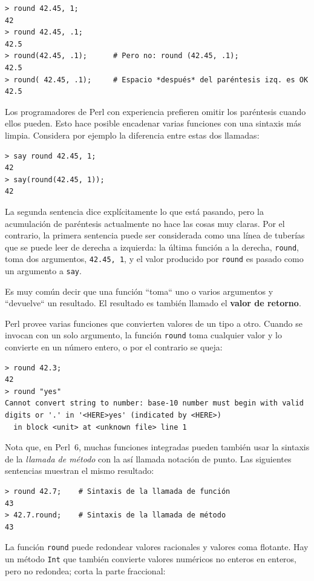 \begin{lstlisting}
> round 42.45, 1;
42
> round 42.45, .1;
42.5
> round(42.45, .1);      # Pero no: round (42.45, .1);
42.5
> round( 42.45, .1);     # Espacio *después* del paréntesis izq. es OK 
42.5
\end{lstlisting}

Los programadores de Perl con experiencia prefieren omitir los 
paréntesis cuando ellos pueden. Esto hace posible encadenar varias 
funciones con una sintaxis más limpia. Considera por ejemplo
la diferencia entre estas dos llamadas:

\begin{lstlisting}
> say round 42.45, 1;
42
> say(round(42.45, 1));
42
\end{lstlisting}

La segunda sentencia dice explícitamente lo que está pasando,
pero la acumulación de paréntesis actualmente no hace las cosas
muy claras. Por el contrario, la primera sentencia puede ser
considerada como una línea de tuberías que se puede leer de derecha 
a izquierda: la última función a la derecha, {\tt round}, toma dos
argumentos, {\tt 42.45, 1}, y el valor producido por {\tt round}
es pasado como un argumento a {\tt say}.

Es muy común decir que una función ``toma`` uno o varios
argumentos y ``devuelve`` un resultado. El resultado es también
llamado el {\bf valor de retorno}.

Perl provee varias funciones que convierten valores de un
tipo a otro. Cuando se invocan con un solo argumento,
la función {\tt round} toma cualquier valor y lo convierte
en un número entero, o por el contrario se queja:

\begin{lstlisting}
> round 42.3;
42
> round "yes"
Cannot convert string to number: base-10 number must begin with valid 
digits or '.' in '<HERE>yes' (indicated by <HERE>)
  in block <unit> at <unknown file> line 1
\end{lstlisting}

%
Nota que, en Perl~6, muchas funciones integradas pueden también
usar la sintaxis de la \emph{llamada de método} con la así 
llamada notación de punto. Las siguientes sentencias muestran el 
mismo resultado:
\begin{lstlisting}
> round 42.7;    # Sintaxis de la llamada de función
43
> 42.7.round;    # Sintaxis de la llamada de método
43
\end{lstlisting}
%
La función {\tt round} puede redondear valores racionales
y valores coma flotante. Hay un método {\tt Int} que también
convierte valores numéricos no enteros en enteros, pero
no redondea; corta la parte fraccional:

